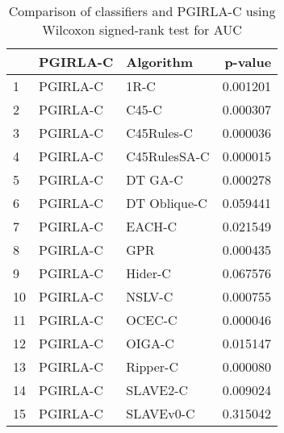 \begin{table}
\footnotesize
\caption{Comparison of classifiers and PGIRLA-C using Wilcoxon signed-rank test for AUC}
\label{tab:PGIRLA-C wilcoxon AUC comparison}
\begin{tabular}{lllr}
\hline
 & PGIRLA-C & Algorithm & p-value \\
\hline
1 & PGIRLA-C & 1R-C & 0.001201 \\
2 & PGIRLA-C & C45-C & 0.000307 \\
3 & PGIRLA-C & C45Rules-C & 0.000036 \\
4 & PGIRLA-C & C45RulesSA-C & 0.000015 \\
5 & PGIRLA-C & DT GA-C & 0.000278 \\
6 & PGIRLA-C & DT Oblique-C & 0.059441 \\
7 & PGIRLA-C & EACH-C & 0.021549 \\
8 & PGIRLA-C & GPR & 0.000435 \\
9 & PGIRLA-C & Hider-C & 0.067576 \\
10 & PGIRLA-C & NSLV-C & 0.000755 \\
11 & PGIRLA-C & OCEC-C & 0.000046 \\
12 & PGIRLA-C & OIGA-C & 0.015147 \\
13 & PGIRLA-C & Ripper-C & 0.000080 \\
14 & PGIRLA-C & SLAVE2-C & 0.009024 \\
15 & PGIRLA-C & SLAVEv0-C & 0.315042 \\
\hline
\end{tabular}
\end{table}
